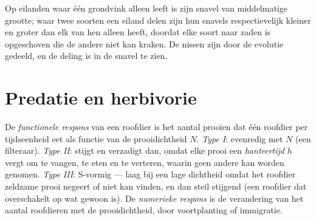 \begin{example}\label{ex:b1:species-interactions:finches}
Op eilanden waar één grondvink alleen leeft is zijn snavel van middelmatige
grootte; waar twee soorten een eiland delen zijn hun snavels respectievelijk
kleiner en groter dan elk van hen alleen heeft, doordat elke soort naar
zaden is opgeschoven die de andere niet kan kraken. De nissen zijn door de
evolutie gedeeld, en de deling is in de snavel te zien.
\end{example}

\section{Predatie en herbivorie}

\begin{definition}\label{def:b1:species-interactions:functional}
De \emph{functionele respons} van een roofdier is het aantal prooien dat
één roofdier per tijdseenheid eet als functie van de prooidichtheid $N$.
\emph{Type I}: evenredig met $N$ (een filteraar). \emph{Type II}: stijgt en
verzadigt dan, omdat elke prooi een \emph{hanteertijd} $h$ vergt om te
vangen, te eten en te verteren, waarin geen andere kan worden genomen.
\emph{Type III}: S-vormig --- laag bij een lage dichtheid omdat het roofdier
zeldzame prooi negeert of niet kan vinden, en dan steil stijgend (een
roofdier dat overschakelt op wat gewoon is). De \emph{numerieke respons} is
de verandering van het aantal roofdieren met de prooidichtheid, door
voortplanting of immigratie.
\end{definition}

